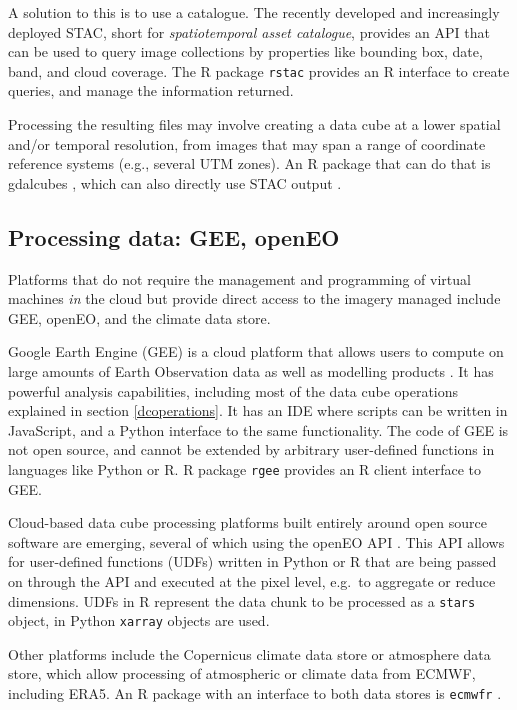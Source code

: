 \documentclass[]{book}
\begin{document}
A solution to this is to use a catalogue. The recently developed
and increasingly deployed STAC, short for \emph{spatiotemporal asset
catalogue}, provides an API that can be used to query image
collections by properties like bounding box, date, band, and cloud
coverage. The R package \texttt{rstac} \citep{R-rstac} provides an R interface
to create queries, and manage the information returned.

Processing the resulting files may involve creating a data cube at
a lower spatial and/or temporal resolution, from images that may
span a range of coordinate reference systems (e.g., several UTM
zones). An R package that can do that is gdalcubes \citep{R-gdalcubes, appel2019demand}, which can also directly use STAC output
\citep{appelblog}.

\hypertarget{processing-data-gee-openeo}{%
\subsection{Processing data: GEE, openEO}\label{processing-data-gee-openeo}}

Platforms that do not require the management and programming of
virtual machines \emph{in} the cloud but provide direct access to the
imagery managed include GEE, openEO, and the climate data store.

Google Earth Engine (GEE) is a cloud platform that allows users
to compute on large amounts of Earth Observation data as well
as modelling products \citep{gorelick}. It has powerful analysis
capabilities, including most of the data cube operations explained
in section \ref{dcoperations}. It has an IDE where scripts can
be written in JavaScript, and a Python interface to the same
functionality. The code of GEE is not open source, and cannot be
extended by arbitrary user-defined functions in languages like
Python or R. R package \texttt{rgee} \citep{R-rgee} provides an R client
interface to GEE.

Cloud-based data cube processing platforms built entirely around
open source software are emerging, several of which using the openEO
API \citep{openEO}. This API allows for user-defined functions (UDFs)
written in Python or R that are being passed on through the API and
executed at the pixel level, e.g.~to aggregate or reduce dimensions.
UDFs in R represent the data chunk to be processed as a \texttt{stars}
object, in Python \texttt{xarray} objects are used.

Other platforms include the Copernicus climate data store \citep{cds}
or atmosphere data store, which allow processing of atmospheric
or climate data from ECMWF, including ERA5. An R package with an
interface to both data stores is \texttt{ecmwfr} \citep{R-ecmwfr}.
\end{document}
